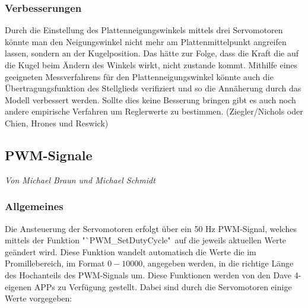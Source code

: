 \documentclass[12pt,a4paper,bibliography=totoc,listof=totoc]{scrartcl}
\begin{document}
\subsubsection{Verbesserungen}
Durch die Einstellung des Plattenneigungswinkels mittels drei Servomotoren könnte man den Neigungswinkel nicht mehr am Plattenmittelpunkt angreifen lassen, sondern an der Kugelposition. Das hätte zur Folge, dass die Kraft die auf die Kugel beim Ändern des Winkels wirkt, nicht zustande kommt.\newline
Mithilfe eines geeigneten Messverfahrens für den Plattenneigungswinkel könnte auch die Übertragungsfunktion des Stellglieds verifiziert und so die Annäherung durch das Modell verbessert werden.
Sollte dies keine Besserung bringen gibt es auch noch andere empirische Verfahren um Reglerwerte zu bestimmen. (Ziegler/Nichols oder Chien, Hrones und Reswick)

\subsection{PWM-Signale}
\textit{Von Michael Braun und Michael Schmidt}\newline
\subsubsection{ Allgemeines}
Die Ansteuerung der Servomotoren erfolgt über ein 50 Hz PWM-Signal, welches mittels der Funktion 
"`PWM\_SetDutyCycle"\, auf die jeweils aktuellen Werte geändert wird. Diese Funktion wandelt automatisch 
die Werte die im Promillebereich, im Format $0-10000$, angegeben werden, in die richtige Länge des 
Hochanteils des PWM-Signals um. Diese Funktionen werden von den Dave 4- eigenen APPs zu Verfügung 
gestellt. Dabei sind durch die Servomotoren einige Werte vorgegeben:
\end{document}
